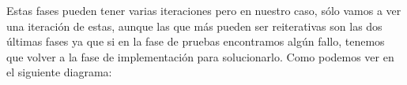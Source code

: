 \documentclass[a4paper,11pt, twoside]{article}
\begin{document}
Estas fases pueden tener varias iteraciones pero en nuestro caso, sólo vamos a ver una iteración de estas, aunque las que más pueden ser reiterativas son las dos últimas fases ya que si en la fase de pruebas encontramos algún fallo, tenemos que volver a la fase de implementación para solucionarlo. Como podemos ver en el siguiente diagrama:
    \begin{figure}[htbp]
                \centering
            \end{figure}        
            
            \newpage
\end{document}
